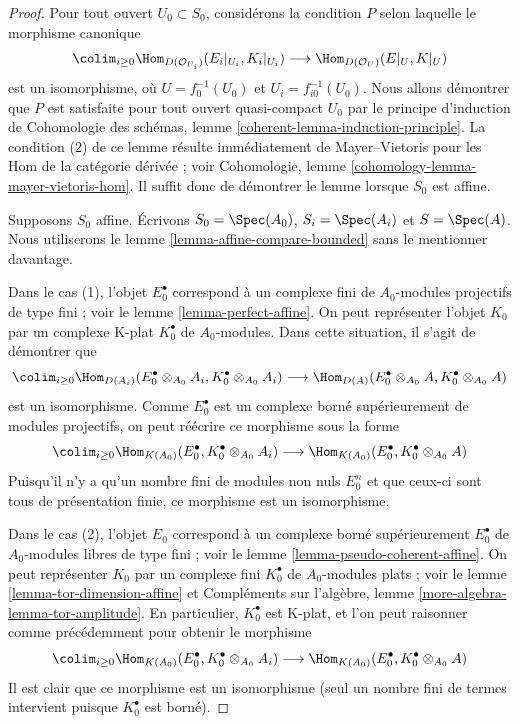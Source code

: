 \begin{proof}
Pour tout ouvert $U_0 \subset S_0$, considérons la condition $P$ selon laquelle le morphisme canonique
$$
\colim_{i \geq 0} \Hom_{D(\mathcal{O}_{U_i})}(E_i|_{U_i}, K_i|_{U_i})
\longrightarrow
\Hom_{D(\mathcal{O}_U)}(E|_U, K|_U)
$$
est un isomorphisme, où $U = f_0^{-1}(U_0)$ et $U_i = f_{i0}^{-1}(U_0)$.
Nous allons démontrer que $P$ est satisfaite pour tout ouvert quasi-compact $U_0$
par le principe d'induction de
Cohomologie des schémas, lemme \ref{coherent-lemma-induction-principle}.
La condition (2) de ce lemme résulte immédiatement de Mayer--Vietoris
pour les Hom de la catégorie dérivée ; voir
Cohomologie, lemme \ref{cohomology-lemma-mayer-vietoris-hom}.
Il suffit donc de démontrer le lemme lorsque $S_0$ est affine.

\medskip\noindent
Supposons $S_0$ affine. Écrivons $S_0 = \Spec(A_0)$, $S_i = \Spec(A_i)$ et
$S = \Spec(A)$. Nous utiliserons le lemme \ref{lemma-affine-compare-bounded}
sans le mentionner davantage.

\medskip\noindent
Dans le cas (1), l'objet $E_0^\bullet$ correspond à un complexe fini
de $A_0$-modules projectifs de type fini ; voir le lemme \ref{lemma-perfect-affine}.
On peut représenter l'objet $K_0$ par un complexe K-plat $K_0^\bullet$
de $A_0$-modules. Dans cette situation, il s'agit de démontrer que
$$
\colim_{i \geq 0} \Hom_{D(A_i)}(E_0^\bullet \otimes_{A_0} A_i,
K_0^\bullet \otimes_{A_0} A_i)
\longrightarrow
\Hom_{D(A)}(E_0^\bullet \otimes_{A_0} A, K_0^\bullet \otimes_{A_0} A)
$$
est un isomorphisme. Comme $E_0^\bullet$ est un complexe borné supérieurement de modules projectifs,
on peut réécrire ce morphisme sous la forme
$$
\colim_{i \geq 0} \Hom_{K(A_0)}(E_0^\bullet,
K_0^\bullet \otimes_{A_0} A_i)
\longrightarrow
\Hom_{K(A_0)}(E_0^\bullet, K_0^\bullet \otimes_{A_0} A)
$$
Puisqu'il n'y a qu'un nombre fini de modules non nuls
$E_0^n$ et que ceux-ci sont tous de présentation finie, ce
morphisme est un isomorphisme.

\medskip\noindent
Dans le cas (2), l'objet $E_0$ correspond à un
complexe borné supérieurement $E_0^\bullet$ de $A_0$-modules libres de type fini ;
voir le lemme \ref{lemma-pseudo-coherent-affine}.
On peut représenter $K_0$ par un complexe fini $K_0^\bullet$
de $A_0$-modules plats ; voir le lemme \ref{lemma-tor-dimension-affine}
et
Compléments sur l'algèbre, lemme \ref{more-algebra-lemma-tor-amplitude}.
En particulier, $K_0^\bullet$ est K-plat, et l'on peut raisonner comme précédemment
pour obtenir le morphisme
$$
\colim_{i \geq 0} \Hom_{K(A_0)}(E_0^\bullet,
K_0^\bullet \otimes_{A_0} A_i)
\longrightarrow
\Hom_{K(A_0)}(E_0^\bullet, K_0^\bullet \otimes_{A_0} A)
$$
Il est clair que ce morphisme est un isomorphisme (seul un nombre fini de
termes intervient puisque $K_0^\bullet$ est borné).
\end{proof}

